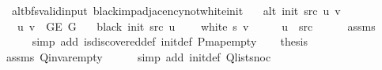 \begin{isabellebody}
\endisatagproof
{\isafoldproof}%
%
\isadelimproof
\isanewline
%
\endisadelimproof
%
\isadeliminvisible
\isanewline
%
\endisadeliminvisible
%
\isataginvisible
{}\isamarkupfalse%
\ {\isacharparenleft}{\kern0pt}\ alt{\isacharunderscore}{\kern0pt}bfs{\isacharunderscore}{\kern0pt}valid{\isacharunderscore}{\kern0pt}input{\isacharparenright}{\kern0pt}\ black{\isacharunderscore}{\kern0pt}imp{\isacharunderscore}{\kern0pt}adjacency{\isacharunderscore}{\kern0pt}not{\isacharunderscore}{\kern0pt}white{\isacharunderscore}{\kern0pt}init{\isacharcolon}{\kern0pt}\isanewline
\ \ \ {\isachardoublequoteopen}alt\ {\isacharparenleft}{\kern0pt}init\ src{\isacharparenright}{\kern0pt}\ u\ v{\isachardoublequoteclose}\isanewline
\ \ \ {\isachardoublequoteopen}{\isacharbraceleft}{\kern0pt}u{\isacharcomma}{\kern0pt}\ v{\isacharbraceright}{\kern0pt}\ {\isasymin}\ G{\isachardot}{\kern0pt}E\ G{\isachardoublequoteclose}\isanewline
\ \ \ {\isachardoublequoteopen}black\ {\isacharparenleft}{\kern0pt}init\ src{\isacharparenright}{\kern0pt}\ u{\isachardoublequoteclose}\isanewline
\ \ \ {\isachardoublequoteopen}{\isasymnot}\ white\ s\ v{\isachardoublequoteclose}%
\endisataginvisible
{\isafoldinvisible}%
%
\isadeliminvisible
\isanewline
%
\endisadeliminvisible
%
\isadelimproof
%
\endisadelimproof
%
\isatagproof
{}\isamarkupfalse%
\ {\isacharminus}{\kern0pt}\isanewline
\ \ \isamarkupfalse%
\ {\isachardoublequoteopen}u\ {\isacharequal}{\kern0pt}\ src{\isachardoublequoteclose}\isanewline
\ \ \ \ \isamarkupfalse%
\ assms{\isacharparenleft}{\kern0pt}{}{\isacharparenright}{\kern0pt}\isanewline
\ \ \ \ \isamarkupfalse%
\ {\isacharparenleft}{\kern0pt}simp\ add{\isacharcolon}{\kern0pt}\ is{\isacharunderscore}{\kern0pt}discovered{\isacharunderscore}{\kern0pt}def\ init{\isacharunderscore}{\kern0pt}def\ P{\isachardot}{\kern0pt}map{\isacharunderscore}{\kern0pt}empty{\isacharparenright}{\kern0pt}\isanewline
\ \ \isamarkupfalse%
\ {\isacharquery}{\kern0pt}thesis\isanewline
\ \ \ \ \isamarkupfalse%
\ assms{\isacharparenleft}{\kern0pt}{}{\isacharparenright}{\kern0pt}\ Q{\isachardot}{\kern0pt}invar{\isacharunderscore}{\kern0pt}empty\isanewline
\ \ \ \ \isamarkupfalse%
\ {\isacharparenleft}{\kern0pt}simp\ add{\isacharcolon}{\kern0pt}\ init{\isacharunderscore}{\kern0pt}def\ Q{\isachardot}{\kern0pt}list{\isacharunderscore}{\kern0pt}snoc{\isacharparenright}{\kern0pt}\isanewline

\end{isabellebody}
